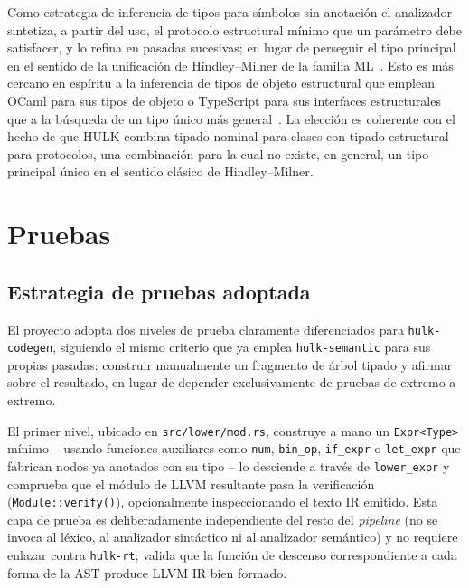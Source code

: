 \documentclass[12pt, a4paper]{article}
\begin{document}
Como estrategia de inferencia de tipos para símbolos sin
anotaci\'{o}n el analizador sintetiza, a partir del uso, el protocolo estructural m\'{i}nimo
que un par\'{a}metro debe satisfacer, y lo refina en pasadas sucesivas; en lugar de perseguir el tipo principal en el sentido de la
unificaci\'{o}n de Hindley--Milner de la familia ML~\cite{milner1978}.  Esto es
m\'{a}s cercano en esp\'{i}ritu a la inferencia de tipos de objeto estructural
que emplean OCaml para sus tipos de objeto o TypeScript para sus interfaces
estructurales~\cite{leroy2023,bierman2014} que a la b\'{u}squeda de un tipo
\'{u}nico m\'{a}s general~\cite{pierce2002,cardelli1985}. La elecci\'{o}n es
coherente con el hecho de que HULK combina tipado nominal para clases con
tipado estructural para protocolos, una combinaci\'{o}n para la cual no existe,
en general, un tipo principal \'{u}nico en el sentido cl\'{a}sico de
Hindley--Milner.

\newpage


\section{Pruebas} 
\label{sec:pruebas}

\subsection{Estrategia de pruebas adoptada}

El proyecto adopta dos niveles de prueba claramente diferenciados para
\texttt{hulk-codegen}, siguiendo el mismo criterio que ya emplea
\texttt{hulk-semantic} para sus propias pasadas: construir manualmente un
fragmento de árbol tipado y afirmar sobre el resultado, en lugar de depender
exclusivamente de pruebas de extremo a extremo.

El primer nivel, ubicado en \texttt{src/lower/mod.rs}, construye a mano un
\texttt{Expr<Type>} mínimo -- usando funciones auxiliares como \texttt{num},
\texttt{bin\_op}, \texttt{if\_expr} o \texttt{let\_expr} que fabrican nodos ya
anotados con su tipo -- lo desciende a través de \texttt{lower\_expr} y
comprueba que el módulo de LLVM resultante pasa la verificación
(\texttt{Module::verify()}), opcionalmente inspeccionando el texto IR emitido.
Esta capa de prueba es deliberadamente independiente del resto del
\textit{pipeline} (no se invoca al léxico, al analizador sintáctico ni al
analizador semántico) y no requiere enlazar contra \texttt{hulk-rt}; valida
que la función de descenso correspondiente a cada forma de la AST produce LLVM
IR bien formado.
\end{document}
